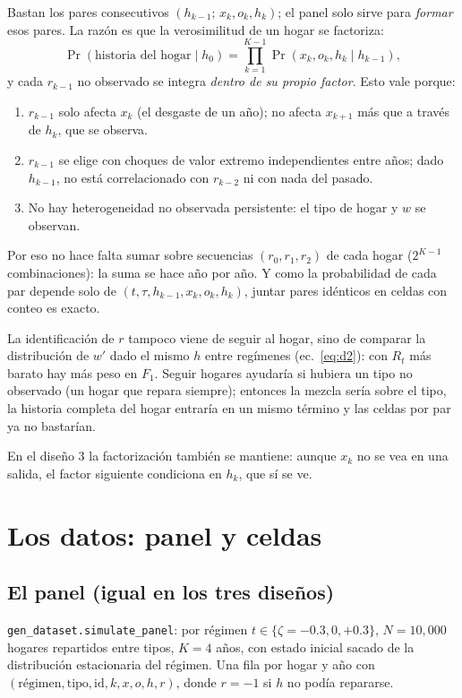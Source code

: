 \documentclass[11pt]{article}
\newcommand{\code}[1]{\texttt{\small #1}}
\newcommand{\1}{\mathbf{1}}
\begin{document}
Bastan los pares consecutivos $(h_{k-1};\,x_k,o_k,h_k)$; el panel solo sirve para
\emph{formar} esos pares. La razón es que la verosimilitud de un hogar se factoriza:
\[
  \Pr(\text{historia del hogar}\mid h_0)=\prod_{k=1}^{K-1}\Pr(x_k,o_k,h_k\mid h_{k-1}),
\]
y cada $r_{k-1}$ no observado se integra \emph{dentro de su propio factor}. Esto vale porque:
\begin{enumerate}
  \item $r_{k-1}$ solo afecta $x_k$ (el desgaste de un año); no afecta $x_{k+1}$ más que a
  través de $h_k$, que se observa.
  \item $r_{k-1}$ se elige con choques de valor extremo independientes entre años; dado
  $h_{k-1}$, no está correlacionado con $r_{k-2}$ ni con nada del pasado.
  \item No hay heterogeneidad no observada persistente: el tipo de hogar y $w$ se observan.
\end{enumerate}
Por eso no hace falta sumar sobre secuencias $(r_0,r_1,r_2)$ de cada hogar
($2^{K-1}$ combinaciones): la suma se hace año por año. Y como la probabilidad de cada par
depende solo de $(t,\tau,h_{k-1},x_k,o_k,h_k)$, juntar pares idénticos en celdas con
conteo es exacto.

La identificación de $r$ tampoco viene de seguir al hogar, sino de comparar la distribución
de $w'$ dado el mismo $h$ entre regímenes (ec.~\eqref{eq:d2}): con $R_t$ más barato hay más
peso en $F_1$. Seguir hogares ayudaría si hubiera un tipo no observado (un hogar que repara
siempre); entonces la mezcla sería sobre el tipo, la historia completa del hogar entraría
en un mismo término y las celdas por par ya no bastarían.

En el diseño 3 la factorización también se mantiene: aunque $x_k$ no se vea en una salida,
el factor siguiente condiciona en $h_k$, que sí se ve.

\section{Los datos: panel y celdas}

\subsection{El panel (igual en los tres diseños)}

\code{gen\_dataset.simulate\_panel}: por régimen $t\in\{\zeta=-0.3,0,+0.3\}$, $N=10{,}000$
hogares repartidos entre tipos, $K=4$ años, con estado inicial sacado de la distribución
estacionaria del régimen. Una fila por hogar y año con
$(\text{régimen},\text{tipo},\text{id},k,x,o,h,r)$, donde $r=-1$ si $h$ no podía repararse.
\end{document}
